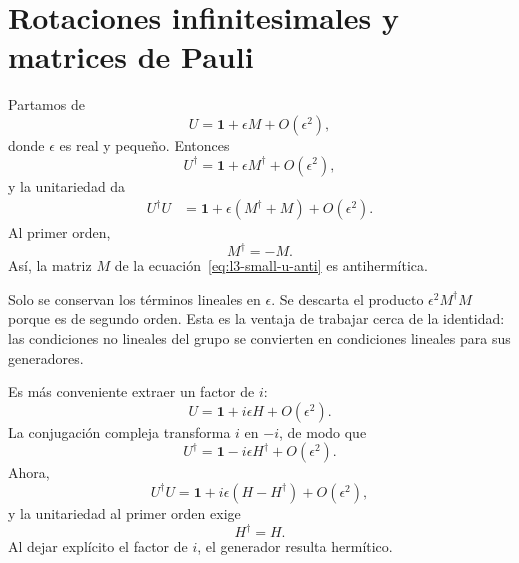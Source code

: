 \section{Rotaciones infinitesimales y matrices de Pauli}

\begin{classroomqa}\end{classroomqa}

Partamos de
\begin{equation}
U=\boldsymbol 1+\epsilon M+O(\epsilon^2),
\label{eq:l3-small-u-anti}
\end{equation}
donde \(\epsilon\) es real y pequeño. Entonces
\begin{equation}
U^\dagger=\boldsymbol 1+\epsilon M^\dagger+O(\epsilon^2),
\end{equation}
y la unitariedad da
\begin{align}
U^\dagger U
 &=\boldsymbol 1+\epsilon(M^\dagger+M)+O(\epsilon^2).
\end{align}
Al primer orden,
\begin{equation}
M^\dagger=-M.
\end{equation}
Así, la matriz \(M\) de la ecuación~\eqref{eq:l3-small-u-anti} es antihermítica.

Solo se conservan los términos lineales en \(\epsilon\). Se descarta el producto \(\epsilon^2M^\dagger M\) porque es de segundo orden. Esta es la ventaja de trabajar cerca de la identidad: las condiciones no lineales del grupo se convierten en condiciones lineales para sus generadores.

Es más conveniente extraer un factor de \(i\):
\begin{equation}
U=\boldsymbol 1+i\epsilon H+O(\epsilon^2).
\label{eq:l3-small-u-herm}
\end{equation}
La conjugación compleja transforma \(i\) en \(-i\), de modo que
\begin{equation}
U^\dagger=\boldsymbol 1-i\epsilon H^\dagger+O(\epsilon^2).
\end{equation}
Ahora,
\begin{equation}
U^\dagger U
=\boldsymbol 1+i\epsilon(H-H^\dagger)+O(\epsilon^2),
\end{equation}
y la unitariedad al primer orden exige
\begin{equation}
H^\dagger=H.
\end{equation}
Al dejar explícito el factor de \(i\), el generador resulta hermítico.

